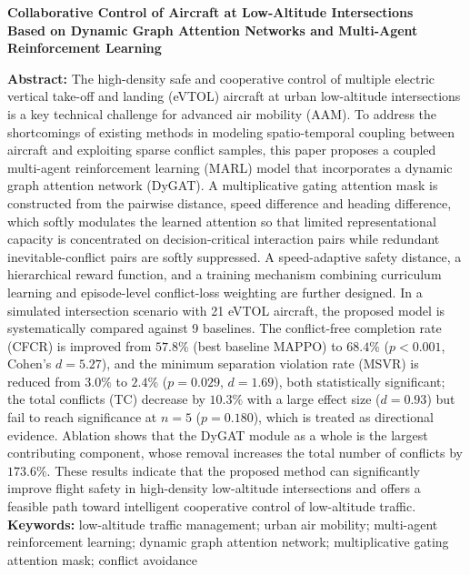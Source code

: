 \documentclass[12pt,a4paper,UTF8]{ctexart}
\begin{document}
\begin{center}
{\Large\bfseries Collaborative Control of Aircraft at Low-Altitude Intersections\\ Based on Dynamic Graph Attention Networks and Multi-Agent Reinforcement Learning}
\end{center}
\vspace{4pt}
\noindent\textbf{Abstract:} The high-density safe and cooperative control of multiple electric vertical take-off and landing (eVTOL) aircraft at urban low-altitude intersections is a key technical challenge for advanced air mobility (AAM). To address the shortcomings of existing methods in modeling spatio-temporal coupling between aircraft and exploiting sparse conflict samples, this paper proposes a coupled multi-agent reinforcement learning (MARL) model that incorporates a dynamic graph attention network (DyGAT). A multiplicative gating attention mask is constructed from the pairwise distance, speed difference and heading difference, which softly modulates the learned attention so that limited representational capacity is concentrated on decision-critical interaction pairs while redundant inevitable-conflict pairs are softly suppressed. A speed-adaptive safety distance, a hierarchical reward function, and a training mechanism combining curriculum learning and episode-level conflict-loss weighting are further designed. In a simulated intersection scenario with 21 eVTOL aircraft, the proposed model is systematically compared against 9 baselines. The conflict-free completion rate (CFCR) is improved from $57.8\%$ (best baseline MAPPO) to $68.4\%$ ($p<0.001$, Cohen's $d=5.27$), and the minimum separation violation rate (MSVR) is reduced from $3.0\%$ to $2.4\%$ ($p=0.029$, $d=1.69$), both statistically significant; the total conflicts (TC) decrease by $10.3\%$ with a large effect size ($d=0.93$) but fail to reach significance at $n=5$ ($p=0.180$), which is treated as directional evidence. Ablation shows that the DyGAT module as a whole is the largest contributing component, whose removal increases the total number of conflicts by $173.6\%$. These results indicate that the proposed method can significantly improve flight safety in high-density low-altitude intersections and offers a feasible path toward intelligent cooperative control of low-altitude traffic.
\vspace{4pt}
\noindent\textbf{Keywords:} low-altitude traffic management; urban air mobility; multi-agent reinforcement learning; dynamic graph attention network; multiplicative gating attention mask; conflict avoidance
\vspace{8pt}
\end{document}
